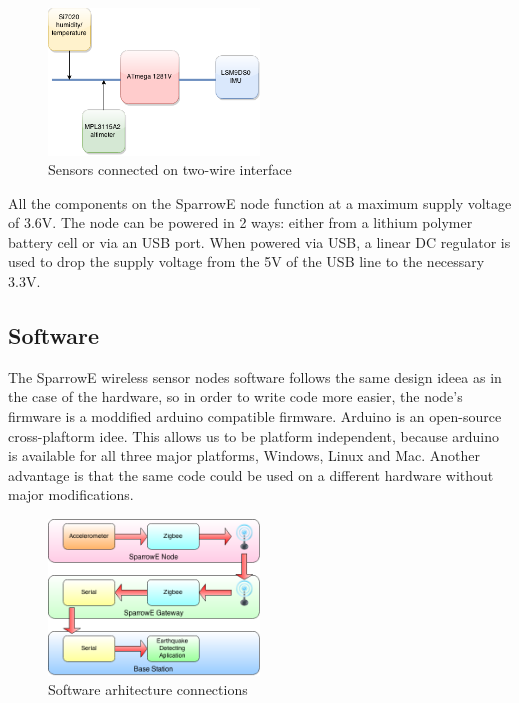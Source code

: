 \begin{figure}[ht] \centering
  \includegraphics[width=0.5\textwidth]{img/i2c-connection.png}
  \caption{Sensors connected on two-wire interface}
\end{figure}

All the components on the SparrowE node function at a maximum supply voltage of 3.6V. The node can be powered in 2 ways: either from a lithium polymer battery 
cell or via an USB port. When powered via USB, a linear DC regulator is used to drop the supply voltage from the 5V of the USB line to the necessary 3.3V.

\subsection{Software}

The SparrowE wireless sensor nodes software follows the same design ideea as in the case of the hardware, so in order to write code more easier, the node's firmware is a moddified arduino compatible firmware. Arduino\cite{arduino} is an open-source cross-plaftorm idee. This allows us to be platform independent, because arduino is available for all three major platforms, Windows, Linux and Mac. Another advantage is that the same code could be used on a different hardware without major modifications.

\begin{figure}[ht] \centering
  \includegraphics[width=0.5\textwidth]{img/software-architecture.png}
  \caption{Software arhitecture connections}
\end{figure}

